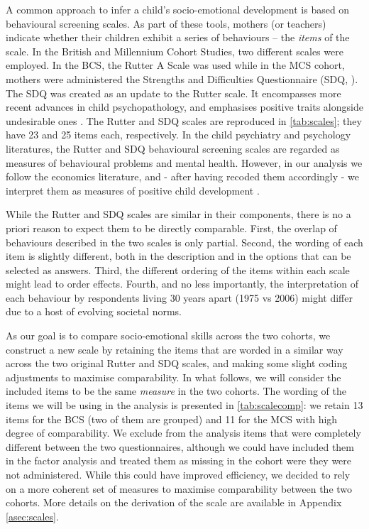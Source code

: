 A common approach to infer a child's socio-emotional development is based on behavioural screening scales. As part of these tools, mothers (or teachers) indicate whether their children exhibit a series of behaviours -- the \emph{items} of the scale. In the British and Millennium Cohort Studies, two different scales were employed. In the BCS, the Rutter A Scale was used \citep{Rutter1970} while in the MCS cohort, mothers were  administered the Strengths and Difficulties Questionnaire (SDQ, \citealp{Goodman1994,Goodman1997}). The SDQ was created as an update to the Rutter scale. It encompasses more recent advances in child psychopathology, and emphasises positive traits alongside undesirable ones \citep{Stone2010}. The Rutter and SDQ scales are reproduced in \autoref{tab:scales}; they have 23 and 25 items each, respectively. In the child psychiatry and psychology literatures, the Rutter and SDQ behavioural screening scales are regarded as measures of behavioural problems and mental health. However, in our analysis we follow the economics literature, and - after having recoded them accordingly - we interpret them as measures of positive child development \citep{Goodman2011}.

While the Rutter and SDQ scales are similar in their components, there is no a priori reason to expect them to be directly comparable. First, the overlap of behaviours described in the two scales is only partial. Second, the wording of each item is slightly different, both in the description and in the options that can be selected as answers. Third, the different ordering of the items within each scale might lead to order effects. Fourth, and no less importantly, the interpretation of each behaviour by respondents living 30 years apart (1975 vs 2006) might differ due to a host of evolving societal norms.

As our goal is to compare socio-emotional skills across the two cohorts, we construct a new scale by retaining the items that are worded in a similar way across the two original Rutter and SDQ scales, and making some slight coding adjustments to maximise comparability. In what follows, we will consider the included items to be the same \emph{measure} in the two cohorts. The wording of the items we will be using in the analysis is presented in \autoref{tab:scalecomp}: we retain 13 items for the BCS (two of them are grouped) and 11 for the MCS with high degree of comparability. We exclude from the analysis items that were completely different between the two questionnaires, although we could have included them in the factor analysis and treated them as missing in the cohort were they were not administered. While this could have improved efficiency, we decided to rely on a more coherent set of measures to maximise comparability between the two cohorts. More details on the derivation of the scale are available in Appendix \autoref{asec:scales}.


